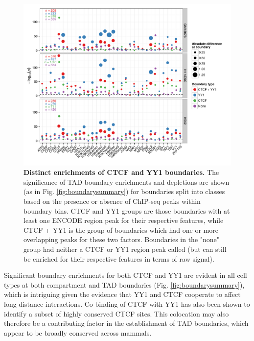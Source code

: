 \documentclass[a4paper,11pt,oneside]{book}
\begin{document}
\begin{figure}
\begin{center} 
\includegraphics[width=5.8in]{figs/ctcfyy1.pdf}
\captionsetup{width=\textwidth}
\caption[Distinct enrichments of CTCF and YY1 boundaries.]{ {\bf Distinct enrichments of CTCF and YY1 boundaries.}
The significance of TAD boundary enrichments and depletions are shown (as in Fig. \ref{fig:boundarysummary}) for boundaries
split into classes based on the presence or absence of ChIP-seq peaks within boundary bins. CTCF and YY1 groups are
those boundaries with at least one ENCODE region peak\cite{Dunham2012} for
their respective features, while CTCF + YY1 is the group of boundaries which had one or more
overlapping peaks for these two factors. Boundaries in the "none" group had neither
a CTCF or YY1 region peak called (but can still
be enriched for their respective features in terms of raw signal). 
}\label{fig:ctcfyy1}
\end{center}
\end{figure} 

Significant boundary enrichments for both CTCF and YY1 are evident in all cell
types at both compartment and TAD boundaries (Fig. \ref{fig:boundarysummary}), which is intriguing given the evidence that YY1 and CTCF
cooperate to affect long distance interactions.\cite{Atchison2014} Co-binding of CTCF with YY1 has also been shown
to identify a subset of highly conserved CTCF sites.\cite{Schwalie2013} This colocation may also therefore be
a contributing factor in the establishment of TAD boundaries, which
appear to be broadly conserved across mammals.\cite{Dixon2012} 
\end{document}
